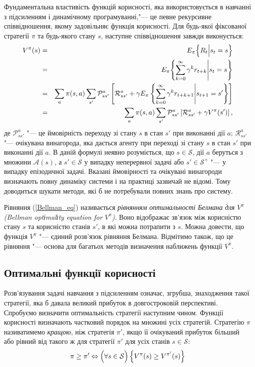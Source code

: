 \documentclass[a4paper,10pt,fleqn]{article}
\begin{document}
Фундаментальна властивість функцій корисності, яка використовується в навчанні з підсиленням і динамічному програмуванні,"--- це певне рекурсивне співвідношення, якому задовільняє функція корисності. Для будь-якої фіксованої стратегії $\pi$ та будь-якого стану $s$, наступне співвідношення завжди виконується:
\begin{eqnarray}
V^\pi(s) & = & E_\pi \Bigl\{R_t \Big| s_t = s \Bigr\} \nonumber\\
			& = & E_\pi \Biggl\{\sum_{k=0}^{\infty}\gamma^k r_{t+k} \Bigg| s_t = s \Biggr\} \nonumber\\
			& = & \sum_a \pi(s,a)\sum_{s'}\mathcal{P}^a_{ss'} \left[ \mathcal{R}^a_{ss'}+\gamma E_\pi \left\{\sum_{k=0}^{\infty}\gamma^k r_{t+k+1} \Bigg| s_{t+1} = s' \right\} \right] \nonumber\\
			& = & \sum_a \pi(s,a)\sum_{s'}\mathcal{P}^a_{ss'} \left[ \mathcal{R}^a_{ss'}+\gamma V^\pi(s') \right],
\label{Bellman_eq}
\end{eqnarray}
де $\mathcal{P}^a_{ss'}$ "--- це ймовірність переходу зі стану $s$ в стан $s'$ при виконанні дії $a$; $\mathcal{R}^a_{ss'}$ "--- очікувана винагорода, яка дається агенту при переході зі стану $s$ в стан $s'$ при виконанні дії $a$. В даній формулі неявно розуміється, що $s \in \mathcal{S}$, дії $a$ беруться з множини $\mathcal{A}(s)$, а $s' \in \mathcal{S}$ у випадку неперервної задачі або $s' \in \mathcal{S^+}$ "--- у випадку епізодичної задачі. Вказані ймовірності та очікувані винагороди визначають повну динаміку системи і на практиці зазвичай не відомі. Тому доводиться шукати методи, які б не потребували повних знань про систему.

Рівняння (\ref{Bellman_eq}) називається \emph{рівнянням оптимальності Белмана для $V^\pi$ (Bellman optіmalіty equation for $V^\pi$)}. Воно відображає зв'язок між корисністю стану $s$ та корисністю станів $s'$, в які можна потрапити з $s$. Можна довести, що функція $V^\pi$ "--- єдиний розв'язок рівняння Белмана. Відмітимо також, що це рівняння "--- основа для багатьох методів визначення наближень функції $V^\pi$.

\subsection{Оптимальні функції корисності}

Розв'язування задачі навчання з підсиленням означає, згрубша, знаходження такої стратегії, яка б давала великий прибуток в довгостроковій перспективі. Спробуємо визначити оптимальність стратегії наступним чином. Функції корисності визначають частковий порядок на множині усіх стратегій. Стратегію $\pi$ називатимемо \emph{кращою}, ніж стратегія $\pi '$, якщо її очікуваний прибуток більший або рівний від такого ж для стратегії $\pi '$ для усіх станів $s \in \mathcal{S}$:
\begin{equation}
\pi \geq \pi ' \Leftrightarrow \Bigl(\forall s \in \mathcal{S}\Bigr)\left\{ V^\pi(s) \geq V^{\pi '}(s) \right\}
\end{equation}
\end{document}
